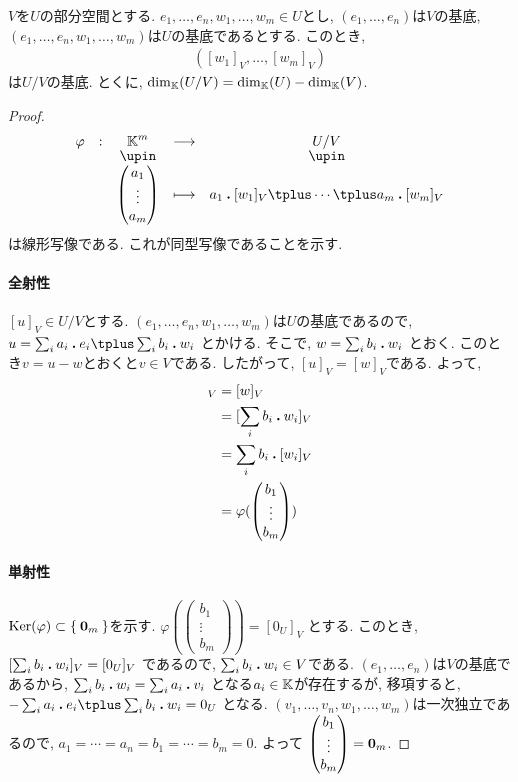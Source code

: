 \begin{theorem}
  \label{thm:dim:quotient}
  $V$を$U$の部分空間とする.
  $e_1,\ldots, e_n,w_1,\ldots,w_m\in U$とし,
  $(e_1,\ldots, e_n)$は$V$の基底,
  $(e_1,\ldots, e_n,w_1,\ldots, w_m)$は$U$の基底であるとする.
  このとき,
  \begin{align*}
    ([w_1]_V,\ldots, [w_m]_V)
  \end{align*}
  は$U/V$の基底.
  とくに, $\dim_{\mathbb{K}}(U/V)=\dim_{\mathbb{K}}(U)-\dim_{\mathbb{K}}(V)$.
\end{theorem}
\begin{proof}
  \begin{align*}
    \shazo{\varphi}{\KK^m}{U/V}
          {\begin{pmatrix}a_1\\\vdots\\a_m\end{pmatrix}}
          {a_1\act [w_1]_V\plus \cdots \plus a_m\act [w_m]_V}
  \end{align*}
  は線形写像である.
  これが同型写像であることを示す.
  \paragraph{全射性}
  $[u]_V\in U/V$とする.
  $(e_1,\ldots, e_n,w_1,\ldots, w_m)$は$U$の基底であるので,
  $u=\sum_{i}a_i\act e_i\plus\sum_{i}b_i \act w_i$
  とかける.
  そこで,
  $w=\sum_{i}b_i \mathbin{\boldsymbol{.}} w_i$
  とおく.
  このとき$v=u-w$とおくと$v\in V$である.
  したがって, $[u]_V=[w]_V$である.
  よって,
  \begin{align*}
    [u]_V
    &=[w]_V\\
    &=[\sum_{i}b_i \act w_i]_V\\
    &=\sum_{i}b_i \act[ w_i]_V\\
    &=\varphi(\begin{pmatrix}b_1\\\vdots\\b_m\end{pmatrix})\\
  \end{align*}
  \paragraph{単射性}
  $\operatorname{Ker}(\varphi)\subset\Set{\boldsymbol{0}_m}$を示す.
  $\varphi(\begin{pmatrix}b_1\\\vdots\\b_m\end{pmatrix})=[0_U]_V$
  とする.
  このとき,
  $[\sum_{i}b_i \mathbin{\boldsymbol{.}} w_i]_V=[0_U]_V$
  であるので, $\sum_{i}b_i \mathbin{\boldsymbol{.}} w_i\in V$である.
  $(e_1,\ldots, e_n)$は$V$の基底であるから,
  $\sum_{i}b_i \mathbin{\boldsymbol{.}} w_i=\sum_{i}a_i\mathbin{\boldsymbol{.}} v_i$
  となる$a_i\in \mathbb{K}$が存在するが,
  移項すると,
  $-\sum_{i}a_i\act e_i\plus\sum_{i}b_i \act w_i=0_U$
  となる.
  $(v_1,\ldots, v_n,w_1,\ldots, w_m)$は一次独立であるので,
  $a_1=\cdots=a_n=b_1=\cdots=b_m=0$.
  よって
  $\begin{pmatrix}b_1\\\vdots\\b_m\end{pmatrix}=\boldsymbol{0}_m$.
\end{proof}

